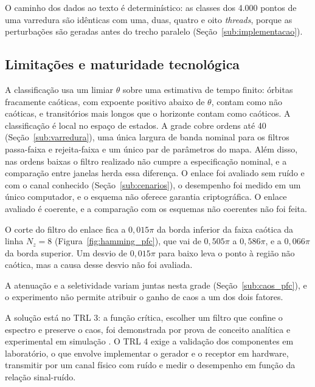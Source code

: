\documentclass{pfccefsa}
\newcommand{\estr}[1]{\textit{#1}}
\begin{document}
O caminho dos dados ao texto é determinístico: as classes dos 4.000 pontos de
uma varredura são idênticas com uma, duas, quatro e oito \estr{threads}, porque as
perturbações são geradas antes do trecho paralelo (Seção~\ref{sub:implementacao}).

\subsection{Limitações e maturidade tecnológica}
\label{sub:limitacoes_pfc}

A classificação usa um limiar $\theta$ sobre uma estimativa de tempo finito:
órbitas fracamente caóticas, com expoente positivo abaixo de $\theta$, contam como não
caóticas, e transitórios mais longos que o horizonte contam como caóticos. A classificação é local no espaço de estados. A grade cobre ordens até
40 (Seção~\ref{sub:varredura}), uma única largura de banda nominal para os
filtros passa-faixa e rejeita-faixa e um único par de parâmetros do mapa. Além disso, nas
ordens baixas o filtro realizado não cumpre a especificação nominal, e a
comparação entre janelas herda essa diferença. O enlace foi avaliado sem ruído e com o canal conhecido
(Seção~\ref{sub:cenarios}), o desempenho foi medido em um único computador, e o
esquema não oferece garantia criptográfica. O enlace avaliado é coerente, e a comparação com os esquemas não
coerentes não foi feita.

O corte do filtro do enlace fica a $0{,}015\pi$ da borda inferior da faixa
caótica da linha $N_z=8$ (Figura~\ref{fig:hamming_pfc}), que vai de $0{,}505\pi$
a $0{,}586\pi$, e a
$0{,}066\pi$ da borda superior. Um desvio de $0{,}015\pi$ para baixo leva o ponto à região não caótica, mas a
causa desse desvio não foi avaliada.

A atenuação e a seletividade variam juntas nesta grade (Seção~\ref{sub:caos_pfc}),
e o experimento não permite atribuir o ganho de caos a um dos dois fatores.

A solução está no TRL 3: a função crítica, escolher um filtro que confine o
espectro e preserve o caos, foi demonstrada por prova de conceito analítica e
experimental em simulação \cite{Mankins1995}. O TRL 4 exige a validação dos
componentes em laboratório, o que envolve implementar o gerador e o receptor em
hardware, transmitir por um canal físico com ruído e medir o desempenho em
função da relação sinal-ruído.
\end{document}
